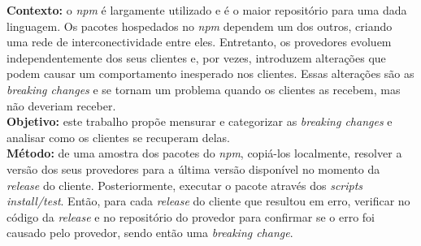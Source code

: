 \begin{resumo}

\textbf{Contexto:} o \textit{npm} é largamente utilizado e é o maior repositório para uma dada linguagem. Os pacotes hospedados no \textit{npm} dependem um dos outros, criando uma rede de interconectividade entre eles. Entretanto, os provedores evoluem independentemente dos seus clientes e, por vezes, introduzem alterações que podem causar um comportamento inesperado nos clientes. Essas alterações são as \textit{breaking changes} e se tornam um problema quando os clientes as recebem, mas não deveriam receber.\\
\textbf{Objetivo:} este trabalho propõe mensurar e categorizar as \textit{breaking changes} e analisar como os clientes se recuperam delas.\\
\textbf{Método:} de uma amostra dos pacotes do \textit{npm}, copiá-los localmente, resolver a versão dos seus provedores para a última versão disponível no momento da \textit{release} do cliente. Posteriormente, executar o pacote através dos \textit{scripts install/test}. Então, para cada \textit{release} do cliente que resultou em erro, verificar no código da \textit{release} e no repositório do provedor para confirmar se o erro foi causado pelo provedor, sendo então uma \textit{breaking change}.\\

\end{resumo}
